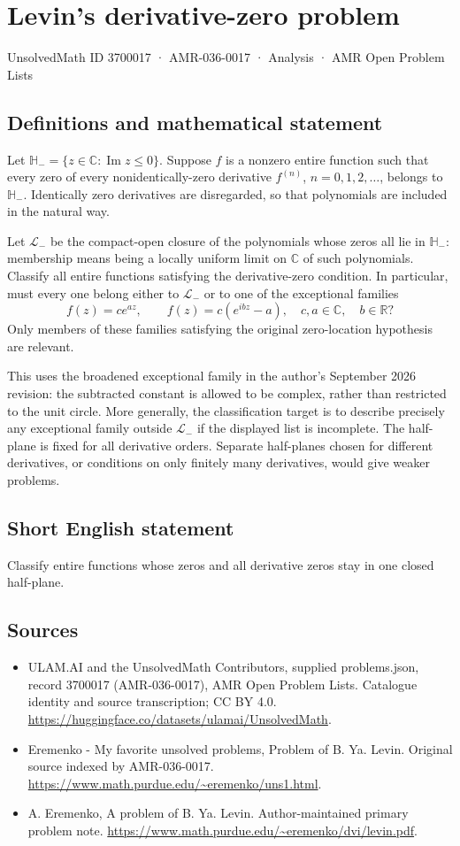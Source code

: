 \documentclass[11pt,a4paper]{article}
\begin{document}
\section*{Levin's derivative-zero problem}\label{3700017}
{\small UnsolvedMath ID 3700017 · AMR-036-0017 · Analysis · AMR Open Problem Lists}
\subsection{Definitions and mathematical statement}
Let $\mathbb H_-=\{z\in\mathbb C:\operatorname{Im}z\leq0\}$.
Suppose $f$ is a nonzero entire function such that every
zero of every nonidentically-zero derivative $f^{(n)}$,
$n=0,1,2,\ldots$, belongs to $\mathbb H_-$.
Identically zero derivatives are disregarded, so that
polynomials are included in the natural way.

Let $\mathcal L_-$ be the compact-open closure of the
polynomials whose zeros all lie in $\mathbb H_-$: membership
means being a locally uniform limit on $\mathbb C$ of
such polynomials. Classify all entire functions satisfying
the derivative-zero condition. In particular, must every
one belong either to $\mathcal L_-$ or to one of the
exceptional families
\[
             f(z)=c e^{az},\qquad
             f(z)=c(e^{ibz}-a),
 \quad c,a\in\mathbb C,\quad b\in\mathbb R?
\]
Only members of these families satisfying the original
zero-location hypothesis are relevant.

This uses the broadened exceptional family in the author's
September 2026 revision: the subtracted constant is allowed
to be complex, rather than restricted to the unit circle.
More generally, the classification target is to describe
precisely any exceptional family outside $\mathcal L_-$
if the displayed list is incomplete.
The half-plane is fixed for all derivative orders. Separate
half-planes chosen for different derivatives, or conditions
on only finitely many derivatives, would give weaker
problems.
\subsection{Short English statement}
Classify entire functions whose zeros and all derivative zeros stay in one closed half-plane.
\subsection{Sources}
\begin{itemize}
\item[S1] ULAM.AI and the UnsolvedMath Contributors, supplied problems.json, record 3700017 (AMR-036-0017), AMR Open Problem Lists. Catalogue identity and source transcription; CC BY 4.0.
\url{https://huggingface.co/datasets/ulamai/UnsolvedMath}.
\item[S2] Eremenko - My favorite unsolved problems, Problem of B. Ya. Levin. Original source indexed by AMR-036-0017.
\url{https://www.math.purdue.edu/~eremenko/uns1.html}.
\item[S3] A. Eremenko, A problem of B. Ya. Levin. Author-maintained primary problem note.
\url{https://www.math.purdue.edu/~eremenko/dvi/levin.pdf}.
\end{itemize}
\end{document}
